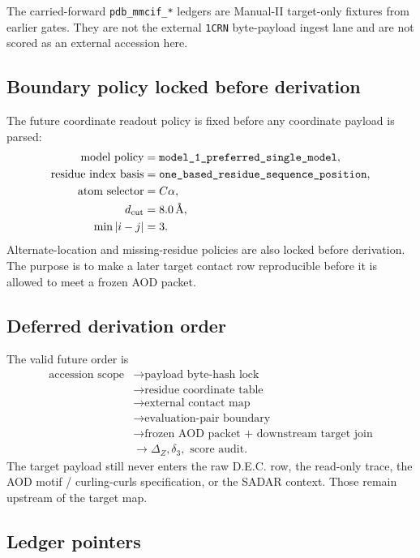 The carried-forward \texttt{pdb\_mmcif\_*} ledgers are Manual-II target-only fixtures from earlier gates. They are not the external \texttt{1CRN} byte-payload ingest lane and are not scored as an external accession here.

\subsection{Boundary policy locked before derivation}

The future coordinate readout policy is fixed before any coordinate payload is parsed:
\[
\begin{aligned}
  \mathrm{model\ policy}&=\texttt{model\_1\_preferred\_single\_model},\\
  \mathrm{residue\ index\ basis}&=\texttt{one\_based\_residue\_sequence\_position},\\
  \mathrm{atom\ selector}&=C\alpha,\\
  d_{\rm cut}&=8.0\,\text{\AA},\\
  \min |i-j|&=3.
\end{aligned}
\]
Alternate-location and missing-residue policies are also locked before derivation. The purpose is to make a later target contact row reproducible before it is allowed to meet a frozen AOD packet.

\subsection{Deferred derivation order}

The valid future order is
\[
\begin{aligned}
\text{accession scope}
&\rightarrow \text{payload byte-hash lock}\\
&\rightarrow \text{residue coordinate table}\\
&\rightarrow \text{external contact map}\\
&\rightarrow \text{evaluation-pair boundary}\\
&\rightarrow \text{frozen AOD packet + downstream target join}\\
&\rightarrow \Delta_Z,\delta_3,\text{ score audit}.
\end{aligned}
\]
The target payload still never enters the raw D.E.C. row, the read-only trace, the AOD motif / curling-curls specification, or the SADAR context. Those remain upstream of the target map.

\subsection{Ledger pointers}

